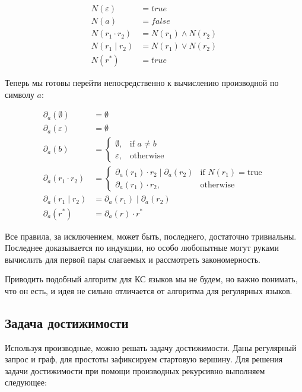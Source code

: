 \begin{align*}
  N(\varepsilon) &= true \\
  N(a) &= false \\ 
  N(r_{1} \cdot r_{2}) &= N(r_{1}) \land N(r_{2}) \\
  N(r_{1} \mid r_{2}) &= N(r_{1}) \lor N(r_{2}) \\
  N(r^*) &= true
\end{align*}

Теперь мы готовы перейти непосредственно к вычислению производной по символу $a$: 

\begin{align*}
  \partial_{a}(\emptyset) &= \emptyset \\
  \partial_{a}(\varepsilon) &= \emptyset \\ 
  \partial_{a}(b) &= \begin{cases} 
  \emptyset, & \mbox{if } a \neq b \\ 
  \varepsilon, & \mbox{otherwise} \end{cases} \\
  \partial_{a}(r_{1} \cdot r_{2}) &= \begin{cases} 
  \partial_{a}(r_{1}) \cdot r_{2} \mid \partial_{a}(r_{2}) & \mbox{if } N(r_{1}) = \mbox{true} \\ 
  \partial_{a}(r_{1}) \cdot r_{2}, & \mbox{otherwise} \end{cases} \\
  \partial_{a}(r_{1} \mid r_{2}) &= \partial_{a}(r_{1}) \mid \partial_{a}(r_{2}) \\
  \partial_{a}(r^*) &= \partial_{a}(r) \cdot r^*
\end{align*}

Все правила, за исключением, может быть, последнего, достаточно тривиальны. Последнее доказывается по индукции, но особо любопытные могут руками вычислить для первой пары слагаемых и рассмотреть закономерность.

Приводить подобный алгоритм для КС языков мы не будем, но важно понимать, что он есть, и идея не сильно отличается от алгоритма для регулярных языков.

\subsection{Задача достижимости}
Используя производные, можно решать задачу достижимости. Даны регулярный запрос и граф, для простоты зафиксируем стартовую вершину. Для решения задачи достижимости при помощи производных рекурсивно выполняем следующее:

